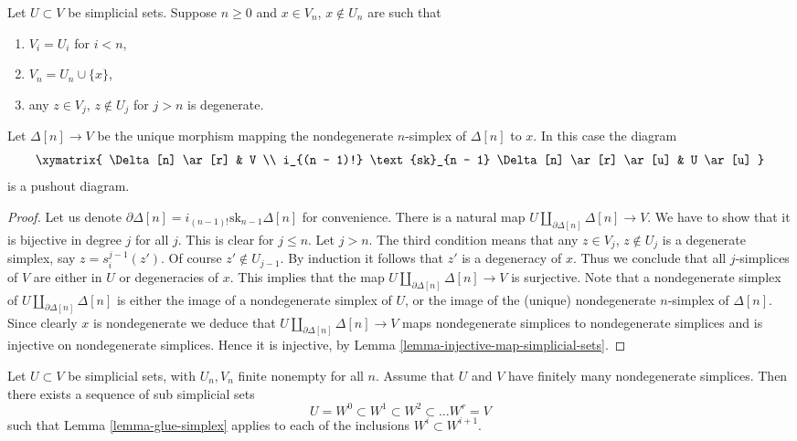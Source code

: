 \begin{lemma}
\label{lemma-glue-simplex}
Let $U \subset V$ be simplicial sets.
Suppose $n \geq 0$ and $x \in V_n$, $x \not \in U_n$ are such that
\begin{enumerate}
\item $V_i = U_i$ for $i < n$,
\item $V_n = U_n \cup \{x\}$,
\item any $z \in V_j$, $z \not \in U_j$ for $j > n$
is degenerate.
\end{enumerate}
Let $\Delta[n] \to V$ be the unique morphism mapping the
nondegenerate $n$-simplex of $\Delta[n]$ to $x$.
In this case the diagram
$$
\xymatrix{
\Delta[n] \ar[r] & V \\
i_{(n - 1)!} \text{sk}_{n - 1} \Delta[n] \ar[r] \ar[u] & U \ar[u]
}
$$
is a pushout diagram.
\end{lemma}

\begin{proof}
Let us denote $\partial \Delta[n] = i_{(n - 1)!} \text{sk}_{n - 1} \Delta[n]$
for convenience. There is a natural map
$U \amalg_{\partial \Delta[n]} \Delta[n] \to V$.
We have to show that it is bijective in degree $j$
for all $j$. This is clear for $j \leq n$. Let $j > n$.
The third condition means that any $z \in V_j$, $z \not \in U_j$
is a degenerate simplex, say $z = s^{j - 1}_i(z')$. Of course
$z' \not \in U_{j - 1}$. By induction it follows that $z'$
is a degeneracy of $x$. Thus we conclude that all $j$-simplices
of $V$ are either in $U$ or degeneracies of $x$. This implies
that the map $U \amalg_{\partial \Delta[n]} \Delta[n] \to V$
is surjective. Note that a nondegenerate simplex of
$U \amalg_{\partial \Delta[n]} \Delta[n]$ is either
the image of a nondegenerate simplex of $U$, or
the image of the (unique) nondegenerate $n$-simplex
of $\Delta[n]$. Since clearly $x$ is nondegenerate we
deduce that $U \amalg_{\partial \Delta[n]} \Delta[n] \to V$
maps nondegenerate simplices to nondegenerate simplices
and is injective on nondegenerate simplices. Hence it is
injective, by Lemma \ref{lemma-injective-map-simplicial-sets}.
\end{proof}

\begin{lemma}
\label{lemma-add-simplices}
Let $U \subset V$ be simplicial sets, with $U_n, V_n$
finite nonempty for all $n$.
Assume that $U$ and $V$ have finitely many nondegenerate simplices.
Then there exists a sequence of sub simplicial sets
$$
U = W^0 \subset W^1 \subset W^2 \subset \ldots W^r = V
$$
such that Lemma \ref{lemma-glue-simplex} applies to each of
the inclusions $W^i \subset W^{i + 1}$.
\end{lemma}


